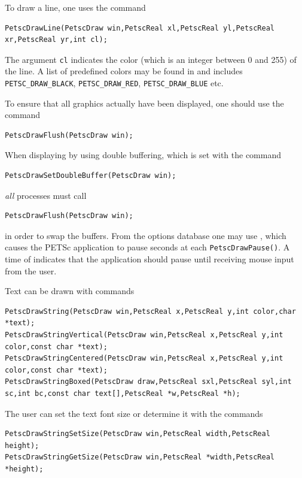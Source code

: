 {{To draw a line, one uses
 the command 
\begin{lstlisting}
PetscDrawLine(PetscDraw win,PetscReal xl,PetscReal yl,PetscReal xr,PetscReal yr,int cl);
\end{lstlisting}
The argument \lstinline{cl} indicates the color (which is an integer between 0 and 255)
of the line. A list of predefined colors may be found in 
and includes \lstinline{PETSC_DRAW_BLACK}, \lstinline{PETSC_DRAW_RED}, \lstinline{PETSC_DRAW_BLUE} etc.

To ensure that all graphics actually have been displayed, one should use
 the
command
\begin{lstlisting}
PetscDrawFlush(PetscDraw win);
\end{lstlisting}
When displaying by using double buffering, which is set with the
command  
\begin{lstlisting}
PetscDrawSetDoubleBuffer(PetscDraw win);
\end{lstlisting}
{\em all} processes must call
\begin{lstlisting}
PetscDrawFlush(PetscDraw win);
\end{lstlisting}
in order to swap the buffers. From the options database one may use
 , which  causes the PETSc application
to pause  seconds at each \lstinline{PetscDrawPause()}. A time of 
indicates that the application should pause until receiving mouse
input from the user.

Text can be drawn with
commands 
\begin{lstlisting}
PetscDrawString(PetscDraw win,PetscReal x,PetscReal y,int color,char *text);
PetscDrawStringVertical(PetscDraw win,PetscReal x,PetscReal y,int color,const char *text);
PetscDrawStringCentered(PetscDraw win,PetscReal x,PetscReal y,int color,const char *text);
PetscDrawStringBoxed(PetscDraw draw,PetscReal sxl,PetscReal syl,int sc,int bc,const char text[],PetscReal *w,PetscReal *h);
\end{lstlisting}
The user can set the text font size or determine it with the
commands
\begin{lstlisting}
PetscDrawStringSetSize(PetscDraw win,PetscReal width,PetscReal height);
PetscDrawStringGetSize(PetscDraw win,PetscReal *width,PetscReal *height);
\end{lstlisting}

}}

